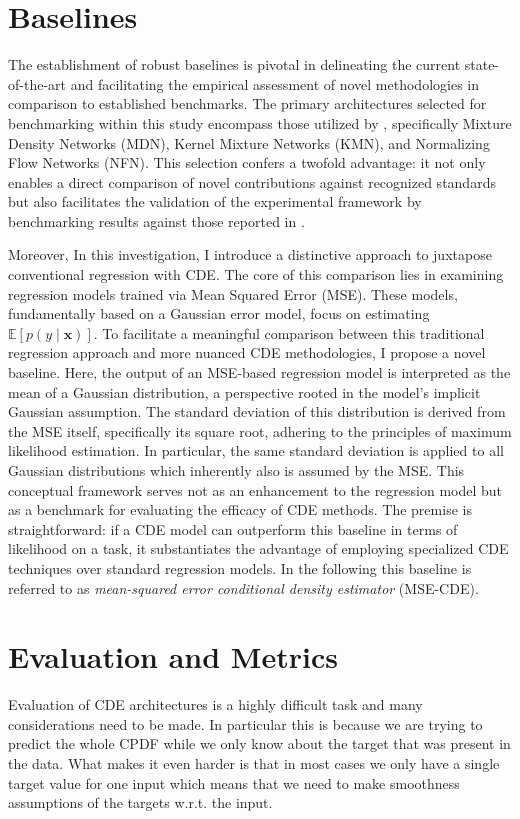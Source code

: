 \documentclass{article}
\begin{document}
\section{Baselines}\label{sec:baselines}

The establishment of robust baselines is pivotal in delineating the current state-of-the-art and facilitating the empirical assessment of novel methodologies in comparison to established benchmarks. The primary architectures selected for benchmarking within this study encompass those utilized by \citep{rothfuss2019noise}, specifically Mixture Density Networks (MDN), Kernel Mixture Networks (KMN), and Normalizing Flow Networks (NFN). This selection confers a twofold advantage: it not only enables a direct comparison of novel contributions against recognized standards but also facilitates the validation of the experimental framework by benchmarking results against those reported in \citep{rothfuss2019noise}.

Moreover, In this investigation, I introduce a distinctive approach to juxtapose conventional regression with CDE. The core of this comparison lies in examining regression models trained via Mean Squared Error (MSE). These models, fundamentally based on a Gaussian error model, focus on estimating $\mathbb{E}\left[p(y\mid \mathbf{x})\right]$. 
To facilitate a meaningful comparison between this traditional regression approach and more nuanced CDE methodologies, I propose a novel baseline. Here, the output of an MSE-based regression model is interpreted as the mean of a Gaussian distribution, a perspective rooted in the model's implicit Gaussian assumption. The standard deviation of this distribution is derived from the MSE itself, specifically its square root, adhering to the principles of maximum likelihood estimation. In particular, the same standard deviation is applied to all Gaussian distributions which inherently also is assumed by the MSE. This conceptual framework serves not as an enhancement to the regression model but as a benchmark for evaluating the efficacy of CDE methods. The premise is straightforward: if a CDE model can outperform this baseline in terms of likelihood on a task, it substantiates the advantage of employing specialized CDE techniques over standard regression models.
In the following this baseline is referred to as \textit{mean-squared error conditional density estimator} (MSE-CDE).

\section{Evaluation and Metrics}\label{sec:evaluation_and_metrics}
Evaluation of CDE architectures is a highly difficult task and many considerations need to be made. In particular this is because we are trying to predict the whole CPDF while we only know about the target that was present in the data. What makes it even harder is that in most cases we only have a single target value for one input which means that we need to make smoothness assumptions of the targets w.r.t. the input.
\end{document}
